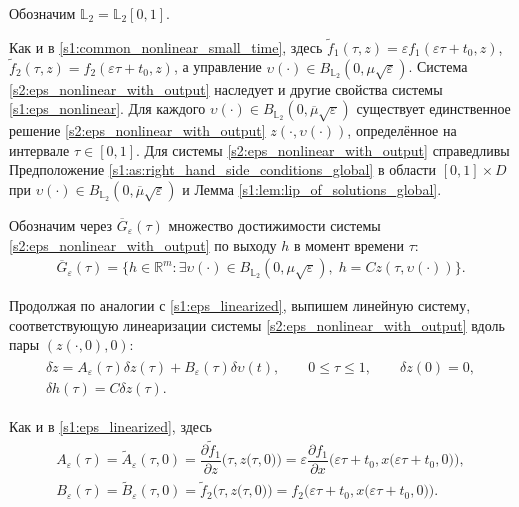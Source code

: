 \documentclass[../main.tex]{subfiles}
\begin{document}
Обозначим $\mathbb{L}_2 = \mathbb{L}_2[0, 1]$. 

Как и в \eqref{s1:common_nonlinear_small_time}, здесь $ \widetilde{f}_1(\tau,z) = \varepsilon f_1(\varepsilon \tau + t_0, z) $, $ \widetilde{f}_2 (\tau,z) = f_2(\varepsilon \tau + t_0,z)$, а управление \mbox{$ \upsilon(\cdot) \in B_{\mathbb{L}_2}(0, \mu\sqrt{\varepsilon})$}.
Система \eqref{s2:eps_nonlinear_with_output} наследует и другие свойства системы \eqref{s1:eps_nonlinear}.
Для каждого $\upsilon(\cdot) \in B_{\mathbb{L}_2} (0, \overline{\mu} \sqrt{\varepsilon})$ существует единственное решение \eqref{s2:eps_nonlinear_with_output} $z(\cdot, \upsilon(\cdot))$, определённое на интервале $\tau \in [0,1]$. 
Для системы \eqref{s2:eps_nonlinear_with_output} справедливы Предположение \ref{s1:as:right_hand_side_conditions_global} в области $[0, 1]\times D$ при $\upsilon(\cdot) \in B_{\mathbb{L}_2}(0, \overline{\mu}\sqrt{\varepsilon}) $ и 
Лемма \ref{s1:lem:lip_of_solutions_global}.

Обозначим через $\overline{G}_{\varepsilon}(\tau)$ множество достижимости системы \eqref{s2:eps_nonlinear_with_output} по выходу $h$ в момент времени $\tau$:
\begin{gather*}
	\overline{G}_{\varepsilon}(\tau)=\{h\in \mathbb{R}^m:\exists \upsilon(\cdot)\in B_{\mathbb{L}_2}(0,\mu\sqrt{\varepsilon}),\; h=Cz(\tau,\upsilon(\cdot))\}.
\end{gather*}

Продолжая по аналогии с \eqref{s1:eps_linearized}, выпишем линейную систему, соответствующую линеаризации системы \eqref{s2:eps_nonlinear_with_output} вдоль пары $(z(\cdot, 0), 0)$:
\begin{gather}\label{s2:eps_linearized}
\begin{gathered}
	\delta\dot{z} = A_{\varepsilon}(\tau) \delta z(\tau) + B_{\varepsilon}(\tau) \delta \upsilon(t),\qquad 0 \leqslant \tau \leqslant 1, \qquad \delta z(0) = 0, \\
	\delta h(\tau) = C \delta z(\tau).
\end{gathered}
\end{gather}

Как и в \eqref{s1:eps_linearized}, здесь 
\begin{gather*}
	A_{\varepsilon}(\tau) = \widetilde{A}_{\varepsilon}(\tau, 0) = \dfrac{\partial \widetilde{f}_1}{\partial z} \Big(\tau, z\big(\tau, 0 \big)\Big) = \varepsilon \dfrac{\partial f_1}{\partial x} \Big(\varepsilon \tau + t_0,x\big(\varepsilon \tau + t_0, 0\big)\Big), \\
	B_{\varepsilon}(\tau) = \widetilde{B}_{\varepsilon}(\tau, 0) = \widetilde{f}_2 \Big(\tau,z\big(\tau, 0\big)\Big) = f_2 \Big(\varepsilon \tau + t_0, x\big(\varepsilon \tau + t_0, 0\big)\Big).
\end{gather*} 
\end{document}
